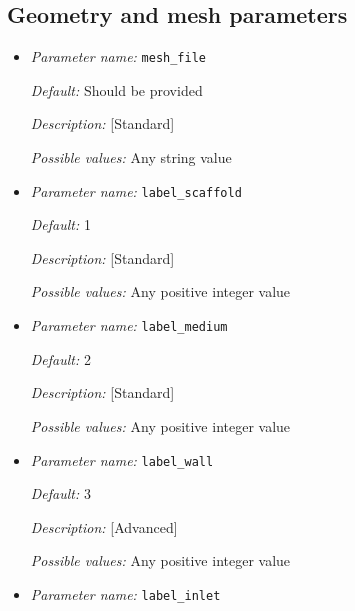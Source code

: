 \subsection{Geometry and mesh parameters}
\label{parameters:mesh}

\begin{itemize}
\item {\it Parameter name:} {\tt mesh\_file}
\label{parameters:mesh_file}


{\it Default:} Should be provided

{\it Description:} [Standard] 

{\it Possible values:} Any string value 


\item {\it Parameter name:} {\tt label\_scaffold}
\label{parameters:label_scaffold}


{\it Default:} 1

{\it Description:} [Standard] 

{\it Possible values:} Any positive integer value 


\item {\it Parameter name:} {\tt label\_medium}
\label{parameters:label_medium}


{\it Default:} 2

{\it Description:} [Standard] 

{\it Possible values:} Any positive integer value 


\item {\it Parameter name:} {\tt label\_wall}
\label{parameters:label_wall}


{\it Default:} 3

{\it Description:} [Advanced] 

{\it Possible values:} Any positive integer value 


\item {\it Parameter name:} {\tt label\_inlet}
\label{parameters:label_inlet}



\end{itemize}
